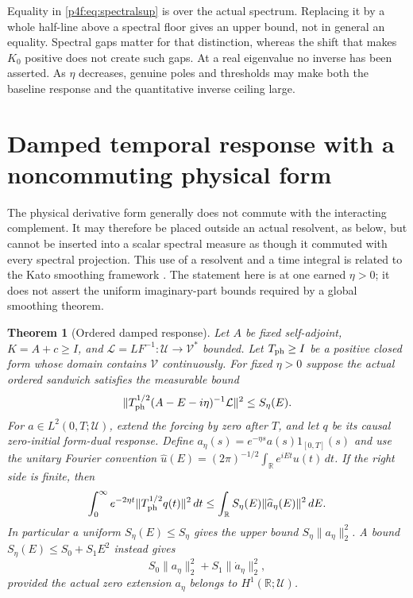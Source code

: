 \documentclass[11pt]{article}
\numberwithin{equation}{section}
\newtheorem{theorem}{Theorem}[section]
\theoremstyle{definition}
\theoremstyle{remark}
\begin{document}
Equality in \eqref{p4f:eq:spectralsup} is over the
actual spectrum. Replacing it by a whole half-line
above a spectral floor gives an upper bound, not
in general an equality. Spectral gaps matter for
that distinction, whereas the shift that makes
$K_0$ positive does not create such gaps.
At a real eigenvalue no inverse has been asserted.
As $\eta$ decreases, genuine poles and thresholds
may make both the baseline response and the
quantitative inverse ceiling large.

\section{Damped temporal response with a noncommuting physical form}
\label{p4f:sec:damped}

The physical derivative form generally does not commute
with the interacting complement. It may therefore be
placed outside an actual resolvent, as below, but cannot
be inserted into a scalar spectral measure as though
it commuted with every spectral projection.
This use of a resolvent and a time integral is related
to the Kato smoothing framework
\cite{Kato1966,DAncona2014}. The statement here is at
one earned $\eta>0$; it does not assert the uniform
imaginary-part bounds required by a global smoothing
theorem.

\begin{theorem}[Ordered damped response]
\label{p4f:thm:damped}
Let $A$ be fixed self-adjoint, $K=A+c\ge I$, and
$\mathcal L=LF^{-1}:\mathcal U\to\mathcal V^*$ bounded.
Let $T_{\rm ph}\ge I$ be a positive closed form whose
domain contains $\mathcal V$ continuously.
For fixed $\eta>0$ suppose the actual ordered sandwich
satisfies the measurable bound
\begin{equation}\label{p4f:eq:orderedbound}
 \|T_{\rm ph}^{1/2}(A-E-i\eta)^{-1}\mathcal L\|^2
                         \le S_\eta(E).
\end{equation}
For $a\in L^2(0,T;\mathcal U)$, extend the forcing by
zero after $T$, and let $q$ be its causal zero-initial
form-dual response. Define
$a_\eta(s)=e^{-\eta s}a(s)1_{[0,T]}(s)$ and use
the unitary Fourier convention
$\widehat u(E)=(2\pi)^{-1/2}\int_{\mathbb R}e^{iEt}u(t)\,dt$.
If the right side is finite, then
\begin{equation}\label{p4f:eq:damped}
 \int_0^\infty e^{-2\eta t}
                      \|T_{\rm ph}^{1/2}q(t)\|^2\,dt
 \le \int_{\mathbb R}S_\eta(E)
                              \|\widehat a_\eta(E)\|^2\,dE .
\end{equation}
In particular a uniform $S_\eta(E)\le S_\eta$ gives
the upper bound $S_\eta\|a_\eta\|_2^2$. A bound
$S_\eta(E)\le S_0+S_1E^2$ instead gives
\begin{equation}\label{p4f:eq:temporalprice}
 S_0\|a_\eta\|_2^2+S_1\|\dot a_\eta\|_2^2,
\end{equation}
provided the actual zero extension $a_\eta$ belongs
to $H^1(\mathbb R;\mathcal U)$.
\end{theorem}
\end{document}
